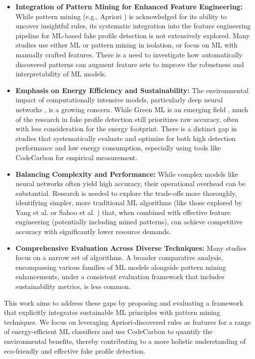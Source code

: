 \documentclass[conference]{IEEEtran}
\begin{document}
\begin{itemize}
    \item \textbf{Integration of Pattern Mining for Enhanced Feature Engineering:} While pattern mining (e.g., Apriori \cite{b10}) is acknowledged for its ability to uncover insightful rules, its systematic integration into the feature engineering pipeline for ML-based fake profile detection is not extensively explored. Many studies use either ML or pattern mining in isolation, or focus on ML with manually crafted features. There is a need to investigate how automatically discovered patterns can augment feature sets to improve the robustness and interpretability of ML models.
    \item \textbf{Emphasis on Energy Efficiency and Sustainability:} The environmental impact of computationally intensive models, particularly deep neural networks \cite{b6, b4}, is a growing concern. While Green ML is an emerging field \cite{b11}, much of the research in fake profile detection still prioritizes raw accuracy, often with less consideration for the energy footprint. There is a distinct gap in studies that systematically evaluate and optimize for both high detection performance and low energy consumption, especially using tools like CodeCarbon \cite{b13} for empirical measurement.
    \item \textbf{Balancing Complexity and Performance:} While complex models like neural networks often yield high accuracy, their operational overhead can be substantial. Research is needed to explore the trade-offs more thoroughly, identifying simpler, more traditional ML algorithms (like those explored by Yang et al. \cite{b7} or Sahoo et al. \cite{b3}) that, when combined with effective feature engineering (potentially including mined patterns), can achieve competitive accuracy with significantly lower resource demands.
    \item \textbf{Comprehensive Evaluation Across Diverse Techniques:} Many studies focus on a narrow set of algorithms. A broader comparative analysis, encompassing various families of ML models alongside pattern mining enhancements, under a consistent evaluation framework that includes sustainability metrics, is less common.
\end{itemize}
This work aims to address these gaps by proposing and evaluating a framework that explicitly integrates sustainable ML principles with pattern mining techniques. We focus on leveraging Apriori-discovered rules as features for a range of energy-efficient ML classifiers and use CodeCarbon to quantify the environmental benefits, thereby contributing to a more holistic understanding of eco-friendly and effective fake profile detection.
\end{document}
